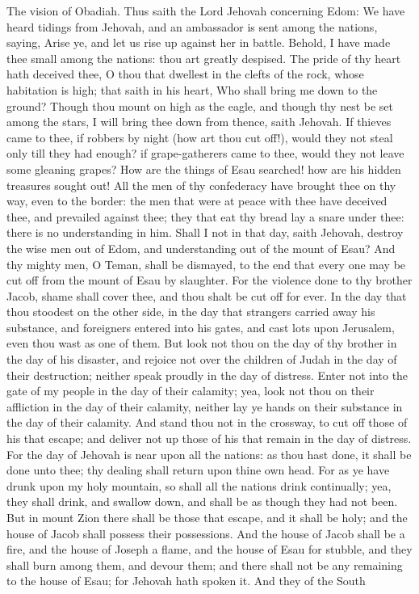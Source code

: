 


The vision of Obadiah. Thus saith the Lord Jehovah concerning Edom: We have heard tidings from Jehovah, and an ambassador is sent among the nations, saying, Arise ye, and let us rise up against her in battle. Behold, I have made thee small among the nations: thou art greatly despised. The pride of thy heart hath deceived thee, O thou that dwellest in the clefts of the rock, whose habitation is high; that saith in his heart, Who shall bring me down to the ground? Though thou mount on high as the eagle, and though thy nest be set among the stars, I will bring thee down from thence, saith Jehovah.  If thieves came to thee, if robbers by night (how art thou cut off!), would they not steal only till they had enough? if grape-gatherers came to thee, would they not leave some gleaning grapes? How are the things of Esau searched! how are his hidden treasures sought out! All the men of thy confederacy have brought thee on thy way, even to the border: the men that were at peace with thee have deceived thee, and prevailed against thee; they that eat thy bread lay a snare under thee: there is no understanding in him. Shall I not in that day, saith Jehovah, destroy the wise men out of Edom, and understanding out of the mount of Esau? And thy mighty men, O Teman, shall be dismayed, to the end that every one may be cut off from the mount of Esau by slaughter.  For the violence done to thy brother Jacob, shame shall cover thee, and thou shalt be cut off for ever. In the day that thou stoodest on the other side, in the day that strangers carried away his substance, and foreigners entered into his gates, and cast lots upon Jerusalem, even thou wast as one of them. But look not thou on the day of thy brother in the day of his disaster, and rejoice not over the children of Judah in the day of their destruction; neither speak proudly in the day of distress. Enter not into the gate of my people in the day of their calamity; yea, look not thou on their affliction in the day of their calamity, neither lay ye hands on their substance in the day of their calamity. And stand thou not in the crossway, to cut off those of his that escape; and deliver not up those of his that remain in the day of distress.  For the day of Jehovah is near upon all the nations: as thou hast done, it shall be done unto thee; thy dealing shall return upon thine own head. For as ye have drunk upon my holy mountain, so shall all the nations drink continually; yea, they shall drink, and swallow down, and shall be as though they had not been.  But in mount Zion there shall be those that escape, and it shall be holy; and the house of Jacob shall possess their possessions. And the house of Jacob shall be a fire, and the house of Joseph a flame, and the house of Esau for stubble, and they shall burn among them, and devour them; and there shall not be any remaining to the house of Esau; for Jehovah hath spoken it. And they of the South 